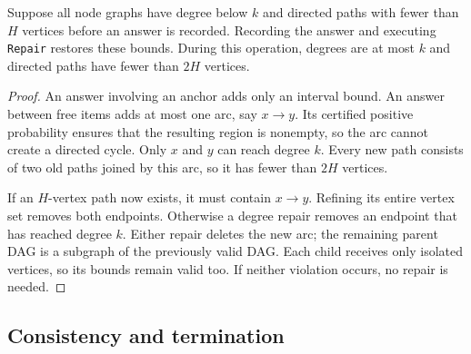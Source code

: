 \begin{lemma}\label{lem:restoration}
Suppose all node graphs have degree below $k$ and directed paths with
fewer than $H$ vertices before an answer is recorded. Recording the
answer and executing \textnormal{\texttt{Repair}} restores these bounds.
During this operation, degrees are at most $k$ and directed paths have
fewer than $2H$ vertices.
\end{lemma}
\begin{proof}
An answer involving an anchor adds only an interval bound. An answer
between free items adds at most one arc, say $x\to y$. Its certified
positive probability ensures that the resulting region is nonempty,
so the arc cannot create a directed cycle. Only $x$ and $y$ can reach
degree $k$. Every new path consists of two old paths joined by this arc,
so it has fewer than $2H$ vertices.

If an $H$-vertex path now exists, it must contain $x\to y$. Refining
its entire vertex set removes both endpoints. Otherwise a degree repair
removes an endpoint that has reached degree $k$. Either repair deletes
the new arc; the remaining parent DAG is a subgraph of the previously
valid DAG. Each child receives only isolated vertices, so its bounds
remain valid too. If neither violation occurs, no repair is needed.
\end{proof}



\subsection{Consistency and termination}

